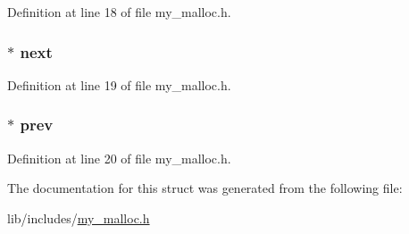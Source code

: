 Definition at line 18 of file my\-\_\-malloc.\-h.

\hypertarget{structs__glist_a20c22490f3a95677fd45a335958ea5da}{
\subsubsection[{next}]{$\ast$ next}}\label{structs__glist_a20c22490f3a95677fd45a335958ea5da}


Definition at line 19 of file my\-\_\-malloc.\-h.

\hypertarget{structs__glist_a3d44f907f8e9a16abd22ce7aa098a912}{
\subsubsection[{prev}]{$\ast$ prev}}\label{structs__glist_a3d44f907f8e9a16abd22ce7aa098a912}


Definition at line 20 of file my\-\_\-malloc.\-h.



The documentation for this struct was generated from the following file\-:\begin{DoxyCompactItemize}
\item 
lib/includes/\hyperlink{my__malloc_8h}{my\-\_\-malloc.\-h}\end{DoxyCompactItemize}
